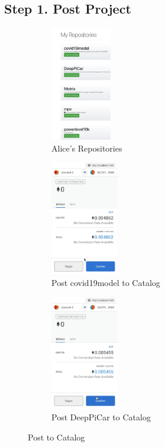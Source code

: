 \documentclass[12pt]{article}
\renewcommand{\_}{\kern-1.5pt\textunderscore\kern-1.5pt}
\begin{document}


\subsection{Step 1. Post Project}

\begin{figure}[H]
	\centering
	\begin{subfigure}[b]{.32\textwidth}
		\centering
		\includegraphics[height=5cm]{graphs/21. alice_repos}
		\caption{Alice's Repositories}
	\end{subfigure}
	\begin{subfigure}[b]{.32\textwidth}
		\centering
		\includegraphics[height=5cm]{graphs/23. alice_post_to_catalog_1}
		\caption{Post covid19model to Catalog}
	\end{subfigure}
	\begin{subfigure}[b]{.32\textwidth}
		\centering
		\includegraphics[height=5cm]{graphs/24. alice_post_to_catalog_2}
		\caption{Post DeepPiCar to Catalog}
	\end{subfigure}

	\caption{Post to Catalog}
\end{figure}
\end{document}
